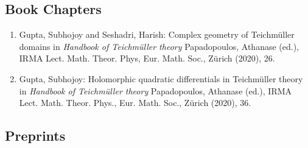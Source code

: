 \subsection{Book Chapters}

\begin{enumerate}
\item Gupta, Subhojoy and Seshadri, Harish: Complex geometry of Teichmüller domains in {\em Handbook of Teichmüller theory} Papadopoulos, Athanase (ed.), IRMA Lect. Math. Theor. Phys, Eur. Math. Soc., Zürich (2020), 26.
\item Gupta, Subhojoy: Holomorphic quadratic differentials in Teichmüller theory in {\em Handbook of Teichmüller theory} Papadopoulos, Athanase (ed.), IRMA Lect. Math. Theor. Phys., Eur. Math. Soc., Zürich (2020), 36.
\end{enumerate}


\subsection{Preprints}

